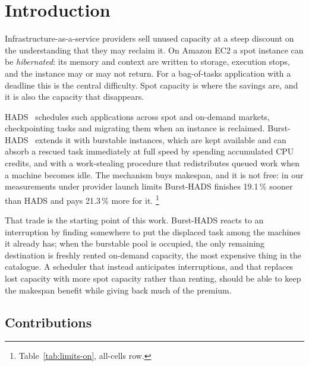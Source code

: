 \documentclass[conference]{IEEEtran}
\begin{document}
\section{Introduction}

Infrastructure-as-a-service providers sell unused capacity at a steep discount
on the understanding that they may reclaim it. On Amazon EC2 a spot instance can
be \emph{hibernated}: its memory and context are written to storage, execution
stops, and the instance may or may not return. For a bag-of-tasks application
with a deadline this is the central difficulty. Spot capacity is where the
savings are, and it is also the capacity that disappears.

HADS~\cite{teylo2021} schedules such applications across spot and on-demand
markets, checkpointing tasks and migrating them when an instance is reclaimed.
Burst-HADS~\cite{teylo2023} extends it with burstable instances, which are kept
available and can absorb a rescued task immediately at full speed by spending
accumulated CPU credits, and with a work-stealing procedure that redistributes
queued work when a machine becomes idle. The mechanism buys makespan, and it is
not free: in our measurements under provider launch limits Burst-HADS finishes
19.1\,\% sooner than HADS and pays 21.3\,\% more for it.%
\footnote{Table~\ref{tab:limits-on}, all-cells row.}

That trade is the starting point of this work. Burst-HADS reacts to an
interruption by finding somewhere to put the displaced task among the machines
it already has; when the burstable pool is occupied, the only remaining
destination is freshly rented on-demand capacity, the most expensive thing in
the catalogue. A scheduler that instead anticipates interruptions, and that
replaces lost capacity with more spot capacity rather than renting, should be
able to keep the makespan benefit while giving back much of the premium.

\subsection{Contributions}
\end{document}
